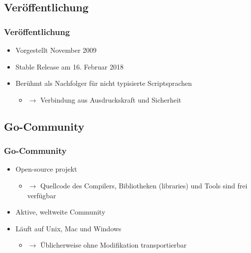 \documentclass{beamer}
\begin{document}
\subsection{Ver\"offentlichung}
\begin{frame}
\frametitle{Ver\"offentlichung}

\begin{itemize}
\setlength{\itemsep}{40pt}
\item Vorgestellt November 2009
\item Stable Release am 16. Februar 2018
\item Ber\"uhmt als Nachfolger für nicht typisierte Scriptsprachen
\begin{itemize}
\item[] $\rightarrow$ Verbindung aus Ausdruckskraft und Sicherheit
\end{itemize}
\end{itemize}

\end{frame}


\subsection{Go-Community}
\begin{frame}
\frametitle{Go-Community}

\begin{itemize}
\setlength{\itemsep}{44pt}
\item Open-source projekt
\begin{itemize}
\item[] $\rightarrow$ Quellcode des Compilers, Bibliotheken (libraries) und Tools sind frei verfügbar
\end{itemize}
\item Aktive, weltweite Community
\item L\"auft auf Unix, Mac und Windows
\begin{itemize}
\item[] $\rightarrow$ \"Ublicherweise ohne Modifikation transportierbar
\end{itemize}
\end{itemize}

\end{frame}
\end{document}
